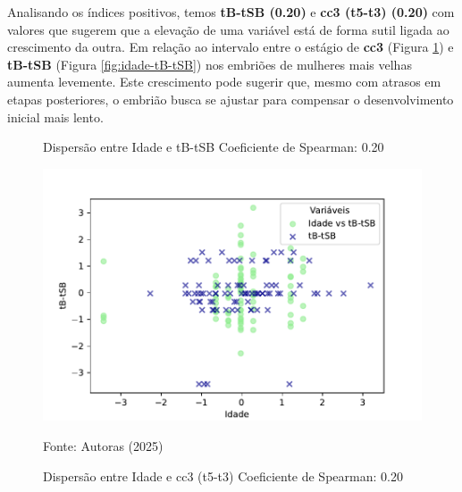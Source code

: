 Analisando os índices positivos, temos \textbf{tB-tSB (0.20)} e \textbf{cc3 (t5-t3) (0.20)} com valores que sugerem que a elevação de uma variável está de forma sutil ligada ao crescimento da outra. Em relação ao intervalo entre o estágio de \textbf{cc3} (Figura \ref{fig:idade-cc3}) e \textbf{tB-tSB} (Figura \ref{fig:idade-tB-tSB}) nos embriões de mulheres mais velhas aumenta levemente. Este crescimento pode sugerir que, mesmo com atrasos em etapas posteriores, o embrião busca se ajustar para compensar o desenvolvimento inicial mais lento.

\begin{figure}[h]
    \captionsetup{font=footnotesize, justification=centering, labelsep=period, position=above}
    \centering
    \begin{minipage}[b]{0.45\linewidth}
        \caption{Dispersão entre Idade e tB-tSB Coeficiente de Spearman: 0.20}
        \label{fig:idade-tB-tSB}
        \centering
        \includegraphics[scale=0.35]{figuras/Spearman/idade-tB-tSB.pdf}
        \vspace{0.3cm}
        \begin{minipage}{\linewidth}
            \centering
            \scriptsize{Fonte: Autoras (2025)}
        \end{minipage}
    \end{minipage}
    \hspace{0.05\linewidth}
    \begin{minipage}[b]{0.45\linewidth}
        \caption{Dispersão entre Idade e cc3 (t5-t3) Coeficiente de Spearman: 0.20}
        \label{fig:idade-cc3}
        \centering

\end{minipage}
\end{figure}
